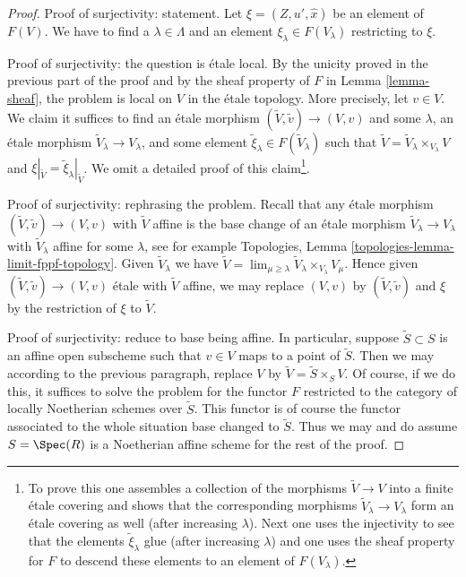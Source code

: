 \begin{proof}
\medskip\noindent
Proof of surjectivity: statement.
Let $\xi = (Z, u', \hat x)$ be an element of $F(V)$.
We have to find a $\lambda \in \Lambda$ and an element
$\xi_\lambda \in F(V_\lambda)$ restricting to $\xi$.

\medskip\noindent
Proof of surjectivity: the question is \'etale local.
By the unicity proved in the previous part of the proof and by the
sheaf property of $F$ in Lemma \ref{lemma-sheaf}, the problem
is local on $V$ in the \'etale topology. More precisely, let $v \in V$.
We claim it suffices to find an \'etale morphism
$(\tilde V, \tilde v) \to (V, v)$ and some
$\lambda$, an \'etale morphism $\tilde V_\lambda \to V_\lambda$,
and some element $\tilde \xi_\lambda \in F(\tilde V_\lambda)$ such that
$\tilde V = \tilde V_\lambda \times_{V_\lambda} V$
and $\xi|_{\tilde V} = \tilde \xi_\lambda|_{\tilde V}$. We omit a detailed proof of
this claim\footnote{To prove this
one assembles a collection of the morphisms $\tilde V \to V$
into a finite \'etale covering and shows that the corresponding morphisms
$\tilde V_\lambda \to V_\lambda$ form an \'etale covering as well (after
increasing $\lambda$). Next one uses the injectivity to see that
the elements $\tilde \xi_\lambda$ glue (after increasing $\lambda$)
and one uses the sheaf property for $F$ to descend these
elements to an element of $F(V_\lambda)$.}.

\medskip\noindent
Proof of surjectivity: rephrasing the problem.
Recall that any \'etale morphism $(\tilde V, \tilde v) \to (V, v)$
with $\tilde V$ affine is the base change of an \'etale morphism
$\tilde V_\lambda \to V_\lambda$ with $\tilde V_\lambda$ affine
for some $\lambda$, see for example
Topologies, Lemma \ref{topologies-lemma-limit-fppf-topology}.
Given $\tilde V_\lambda$ we have
$\tilde V = \lim_{\mu \geq \lambda} \tilde V_\lambda \times_{V_\lambda} V_\mu$.
Hence given $(\tilde V, \tilde v) \to (V, v)$ \'etale with $\tilde V$ affine,
we may replace $(V, v)$ by $(\tilde V, \tilde v)$ and $\xi$ by
the restriction of $\xi$ to $\tilde V$.

\medskip\noindent
Proof of surjectivity: reduce to base being affine. In particular,
suppose $\tilde S \subset S$ is an affine open subscheme such
that $v \in V$ maps to a point of $\tilde S$. Then we may according
to the previous paragraph, replace $V$ by $\tilde V = \tilde S \times_S V$.
Of course, if we do this, it suffices to solve the problem
for the functor $F$ restricted to the category of locally Noetherian
schemes over $\tilde S$. This functor is of course the functor
associated to the whole situation base changed to $\tilde S$.
Thus we may and do assume $S = \Spec(R)$ is a Noetherian affine scheme
for the rest of the proof.


\end{proof}
